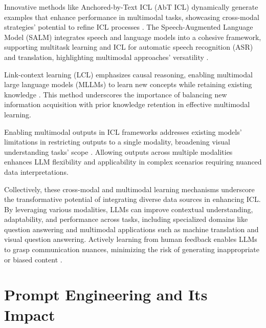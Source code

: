 Innovative methods like Anchored-by-Text ICL (AbT ICL) dynamically generate examples that enhance performance in multimodal tasks, showcasing cross-modal strategies' potential to refine ICL processes \cite{miyanishi2024multimodalcontrastiveincontextlearning}. The Speech-Augmented Language Model (SALM) integrates speech and language models into a cohesive framework, supporting multitask learning and ICL for automatic speech recognition (ASR) and translation, highlighting multimodal approaches' versatility \cite{chen2023salmspeechaugmentedlanguagemodel}.

Link-context learning (LCL) emphasizes causal reasoning, enabling multimodal large language models (MLLMs) to learn new concepts while retaining existing knowledge \cite{tai2023linkcontextlearningmultimodalllms}. This method underscores the importance of balancing new information acquisition with prior knowledge retention in effective multimodal learning.

Enabling multimodal outputs in ICL frameworks addresses existing models' limitations in restricting outputs to a single modality, broadening visual understanding tasks' scope \cite{sheng2024unifiedincontextvisualunderstanding}. Allowing outputs across multiple modalities enhances LLM flexibility and applicability in complex scenarios requiring nuanced data interpretations.

Collectively, these cross-modal and multimodal learning mechanisms underscore the transformative potential of integrating diverse data sources in enhancing ICL. By leveraging various modalities, LLMs can improve contextual understanding, adaptability, and performance across tasks, including specialized domains like question answering and multimodal applications such as machine translation and visual question answering. Actively learning from human feedback enables LLMs to grasp communication nuances, minimizing the risk of generating inappropriate or biased content \cite{moradi2024exploringlandscapelargelanguage,mojarradi2024improvingincontextlearningsmall,wang2024bettersumusingaggregated}.










\section{Prompt Engineering and Its Impact} \label{sec:Prompt Engineering and Its Impact}


